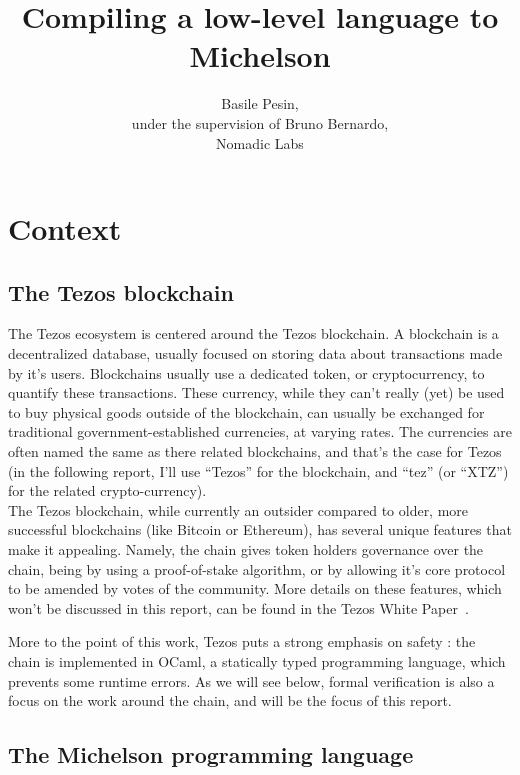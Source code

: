 \documentclass{report}
\title{Compiling a low-level language to Michelson}
\author{Basile Pesin,\\
  under the supervision of Bruno Bernardo,\\
  Nomadic Labs}
\begin{document}
\maketitle

\tableofcontents

\chapter*{Context}

\section{The Tezos blockchain}

The Tezos ecosystem is centered around the Tezos blockchain. A blockchain is a decentralized database, usually focused on storing data about transactions made by it's users. Blockchains usually use a dedicated token, or cryptocurrency, to quantify these transactions. These currency, while they can't really (yet) be used to buy physical goods outside of the blockchain, can usually be exchanged for traditional government-established currencies, at varying rates. The currencies are often named the same as there related blockchains, and that's the case for Tezos (in the following report, I'll use ``Tezos'' for the blockchain, and ``tez'' (or ``XTZ'') for the related crypto-currency).\\

The Tezos blockchain, while currently an outsider compared to older, more successful blockchains (like Bitcoin or Ethereum), has several unique features that make it appealing. Namely, the chain gives token holders governance over the chain, being by using a proof-of-stake algorithm, or by allowing it's core protocol to be amended by votes of the community. More details on these features, which won't be discussed in this report, can be found in the Tezos White Paper~\cite{whitePaper}.

More to the point of this work, Tezos puts a strong emphasis on safety : the chain is implemented in OCaml, a statically typed programming language, which prevents some runtime errors. As we will see below, formal verification is also a focus on the work around the chain, and will be the focus of this report.

\section{The Michelson programming language}
\end{document}
